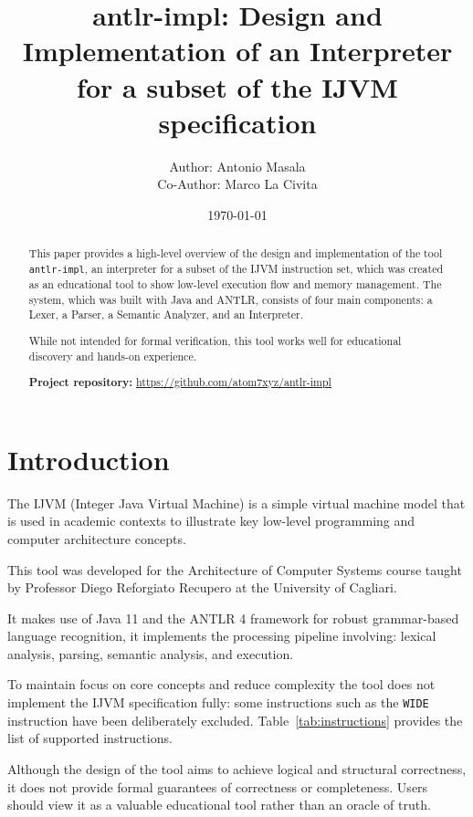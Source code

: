 \documentclass[11pt]{article}
\title{antlr-impl: Design and Implementation of an Interpreter for a subset of the IJVM specification}
\author{
    Author: Antonio Masala\\
    Co-Author: Marco La Civita
}
\date{\today}
\begin{document}
\maketitle

\begin{abstract}
This paper provides a high-level overview of the design and implementation of the tool \texttt{antlr-impl}, an interpreter for a subset of the IJVM instruction set, which was created as an educational tool to show low-level execution flow and memory management. 
The system, which was built with Java and ANTLR, consists of four main components: a Lexer, a Parser, a Semantic Analyzer, and an Interpreter. 

While not intended for formal verification, this tool works well for educational discovery and hands-on experience.

\vspace{2em}
\noindent
\textbf{Project repository:} \url{https://github.com/atom7xyz/antlr-impl}
\end{abstract}

\newpage

\section{Introduction}
The IJVM (Integer Java Virtual Machine) is a simple virtual machine model that is used in academic contexts to illustrate key low-level programming and computer architecture concepts.  

This tool was developed for the Architecture of Computer Systems course taught by Professor Diego Reforgiato Recupero at the University of Cagliari. 

It makes use of Java 11 and the ANTLR 4 framework for robust grammar-based language recognition, it implements the processing pipeline involving: lexical analysis, parsing, semantic analysis, and execution.

To maintain focus on core concepts and reduce complexity the tool does not implement the IJVM specification fully: some instructions such as the  \texttt{WIDE} instruction have been deliberately excluded. Table~\ref{tab:instructions} provides the list of supported instructions.

Although the design of the tool aims to achieve logical and structural correctness, it does not provide formal guarantees of correctness or completeness. Users should view it as a valuable educational tool rather than an oracle of truth.
\end{document}
